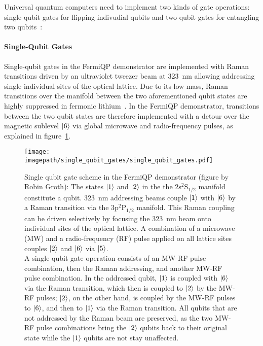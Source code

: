 Universal quantum computers need to implement two kinds of gate operations: single-qubit gates for flipping indivudial qubits and two-qubit gates for entangling two qubits~\cite{mainzer_quantencomputer_2020}:

\paragraph*{Single-Qubit Gates}
Single-qubit gates in the FermiQP demonstrator are implemented with Raman transitions driven by an ultraviolet tweezer beam at \SI[]{323}{\nano\meter} allowing addressing single individual sites of the optical lattice. Due to its low mass, Raman transitions over the manifold between the two aforementioned qubit states are highly suppressed in  fermonic lithium~\cite{wei_magnetic-field_2013}. In the FermiQP demonstrator, transitions between the two qubit states are therefore implemented with a detour over the magnetic sublevel $\Ket{6}$ via global microwave and radio-frequency pulses, as explained in figure~\ref{fig:single_qubit_gates}.

\begin{figure}
    \centering
    \texttt{[image: \\imagepath/single\_qubit\_gates/single\_qubit\_gates.pdf]}
    \caption{Single qubit gate scheme in the FermiQP demonstrator (figure by Robin Groth): The states $\Ket{1}$ and $\Ket{2}$ in the the $2\text{s} ^2\text{S}_{1/2}$ manifold constitute a qubit.
    \SI[]{323}{\nano\meter} addressing beams couple $\Ket{1}$ with $\Ket{6}$ by a Raman transition via the $3\text{p} ^2\text{P}_{1/2}$ manifold. This Raman coupling can be driven selectively by focusing the \SI[]{323}{\nano\meter} beam onto individual sites of the optical lattice.
    A combination of a microwave (MW) and a radio-frequency (RF) pulse applied on all lattice sites couples $\Ket{2}$ and $\Ket{6}$ via $\Ket{5}$.\\
    A single qubit gate operation consists of an MW-RF pulse combination, then the Raman addressing, and another MW-RF pulse combination.
    In the addressed qubit, $\Ket{1}$ is coupled with $\Ket{6}$ via the Raman transition, which then is coupled to $\Ket{2}$ by the MW-RF pulses; $\Ket{2}$, on the other hand, is coupled by the MW-RF pulses to $\Ket{6}$, and then to $\Ket{1}$ via the Raman transition.
    All qubits that are not addressed by the Raman beam are preserved, as the two MW-RF pulse combinations bring the $\Ket{2}$ qubits back to their original state while the $\Ket{1}$ qubits are not stay unaffected.}
    \label{fig:single_qubit_gates}
\end{figure}

